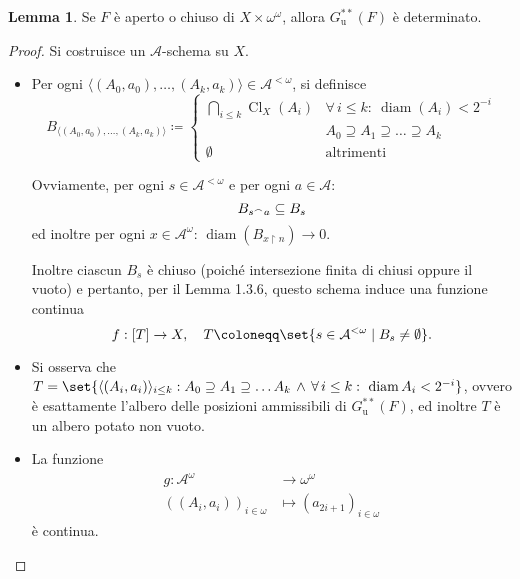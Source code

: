 \documentclass[titlepage]{article}
\newcommand{\1}{\mathds{1}}
\newcommand{\concat}{\null^{\frown}} %
\theoremstyle{definition}%
\newtheorem{lem}[thm]{Lemma}
\theoremstyle{plain}
\theoremstyle{remark}
\begin{document}
\begin{lem}\label{sec:org682507b}
Se \(F\) è aperto o chiuso di \(X\times\omega^{\omega}\), allora \(G^{**}_{\text{u}}(F)\) è determinato.
\end{lem}
\begin{proof}
Si costruisce un \(\mathcal{A}\)-schema su \(X\).
\begin{itemize}
\item Per ogni \(\langle (A_{0},a_{0}),\dots,(A_{k},a_{k})\rangle \in \mathcal{A}^{<\omega}\), si definisce
\begin{equation*}
  B_{\langle (A_{0},a_{0}),\dots,(A_{k},a_{k})\rangle} \coloneqq \begin{cases}
  	\bigcap_{i\le k} \operatorname{Cl}_{X}(A_{i}) & \forall\,i\le k: \ \operatorname{diam}(A_{i})<2^{-i}\\
  	& A_{0} \supseteq A_{1}\supseteq \dots \supseteq A_{k}\\[1em]
  	\emptyset &\text{altrimenti}
      \end{cases}
\end{equation*}

Ovviamente, per ogni \(s \in \mathcal{A}^{<\omega}\) e per ogni \(a \in \mathcal{A}\):
\begin{equation*}
  	B_{s\concat a} \subseteq B_{s}
\end{equation*}
ed inoltre per ogni \(x \in \mathcal{A}^{\omega}\): \(\operatorname{diam}(B_{x\upharpoonright n})\to 0\).

Inoltre ciascun \(B_{s}\) è chiuso (poiché intersezione finita di chiusi oppure il vuoto) e pertanto, per il Lemma 1.3.6, questo schema induce una funzione continua
\begin{equation*}
  	f:[T]\to X,\quad T\coloneqq \set{s \in \mathcal{A}^{<\omega}\mid B_{s}\neq \emptyset}.
\end{equation*}

\item Si osserva che \(T=\set{\langle (A_{i},a_{i})\rangle_{i\le k}: A_{0}\supseteq A_{1}\supseteq \dots A_{k} \,\land\, \forall\, i\le k:\ \operatorname{diam}A_{i}<2^{-i}}\), ovvero è esattamente l'albero delle posizioni ammissibili di \(G^{**}_{\text{u}}(F)\), ed inoltre \(T\) è un albero potato non vuoto.

\item La funzione
\begin{align*}
g: \mathcal{A}^{\omega} &\longrightarrow \omega^{\omega}\\
\left((A_{i},a_{i})\right)_{i \in\omega}&\longmapsto (a_{2i+1})_{i \in\omega}
\end{align*}
è continua.


\end{itemize}
\end{proof}
\end{document}
